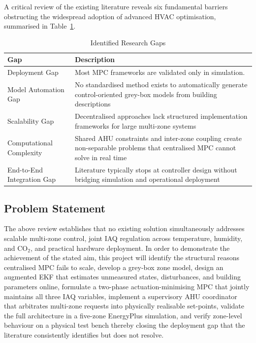 \documentclass[12pt, a4paper]{article}
\begin{document}
	A critical review of the existing literature reveals six fundamental barriers obstructing the widespread adoption of advanced HVAC optimisation, summarised in Table~\ref{tab:gaps}.
	
	\begin{table}[h]
		\centering
		\caption{Identified Research Gaps}
		\label{tab:gaps}
		\begin{tabular}{lp{9.5cm}}
			\toprule
			\textbf{Gap} & \textbf{Description} \\
			\midrule
			Deployment Gap & Most MPC frameworks are validated only in simulation.  \\
			Model Automation Gap & No standardised method exists to automatically generate control-oriented grey-box models from building descriptions \\
			Scalability Gap & Decentralised approaches lack structured implementation frameworks for large multi-zone systems \\
			Computational Complexity & Shared AHU constraints and inter-zone coupling create non-separable problems that centralised MPC cannot solve in real time \\
			End-to-End Integration Gap & Literature typically stops at controller design without bridging simulation and operational deployment \\
			\bottomrule
		\end{tabular}
	\end{table}
	
	\subsection{Problem Statement}
	
	The above review establishes that no existing solution simultaneously addresses scalable multi-zone control, joint IAQ regulation across temperature, humidity, and CO$_2$, and practical hardware deployment. In order to demonstrate the achievement of the stated aim, this project will identify the structural reasons centralised MPC fails to scale, develop a grey-box zone model, design an augmented EKF that estimates unmeasured states, disturbances, and building parameters online, formulate a two-phase actuation-minimising MPC that jointly maintains all three IAQ variables, implement a supervisory AHU coordinator that arbitrates multi-zone requests into physically realisable set-points, validate the full architecture in a five-zone EnergyPlus simulation, and verify zone-level behaviour on a physical test bench thereby closing the deployment gap that the literature consistently identifies but does not resolve.
	
\end{document}
